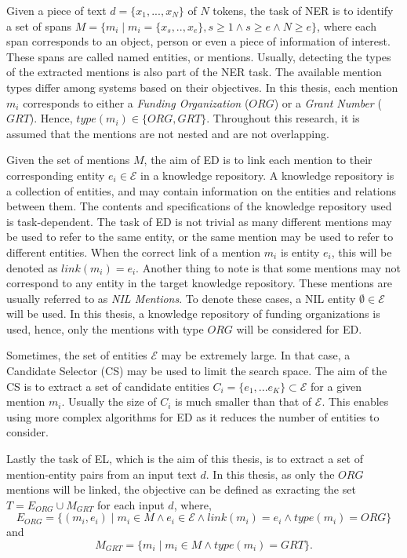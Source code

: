 \documentclass{report}
\theoremstyle{definition}
\theoremstyle{remark}
\begin{document}
Given a piece of text $d=\{x_1,...,x_N\}$ of $N$ tokens, the task of NER is to identify a set of spans $M = \{m_i \mid m_i = \{x_s,..,x_e\}, s \geq 1 \land s\geq e \land N \geq e\}$, where each span corresponds to an object, person or even a piece of information of interest. These spans are called named entities, or mentions. Usually, detecting the types of the extracted mentions is also part of the NER task. The available mention types differ among systems based on their objectives. In this thesis, each mention $m_i$ corresponds to either a \textit{Funding Organization} ($ORG$)  or a \textit{Grant Number} ($GRT$). Hence, $type(m_i) \in \{ORG,GRT\}$. Throughout this research, it is assumed that the mentions are not nested and are not overlapping.

Given the set of mentions $M$, the aim of ED is to link each mention to their corresponding entity $e_i \in \mathcal{E} $ in a knowledge repository. A knowledge repository is a collection of entities, and may contain information on the entities and relations between them. The contents and specifications of the knowledge repository used is task-dependent. The task of ED is not trivial as many different mentions may be used to refer to the same entity, or the same mention may be used to refer to different entities. When the correct link of a mention $m_i$ is entity $e_i$, this will be denoted as $link(m_i) = e_i $.  Another thing to note is that some mentions may not correspond to any entity in the target knowledge repository. These mentions are usually referred to as \textit{NIL Mentions}. To denote these cases, a NIL entity $\emptyset \in \mathcal{E}$ will be used. In this thesis, a knowledge repository of funding organizations is used, hence, only the mentions with type $ORG$ will be considered for ED.

Sometimes, the set of entities $\mathcal{E}$ may be extremely large. In that case, a Candidate Selector (CS) may be used to limit the search space. The aim of the CS is to extract a set of candidate entities $C_i = \{e_1,...e_K\} \subset \mathcal{E} $ for a given mention $m_i$. Usually the size of $C_i$ is much smaller than that of $\mathcal{E}$. This enables using more complex algorithms for ED as it reduces the number of entities to consider.

Lastly the task of EL, which is the aim of this thesis, is to extract a set of mention-entity pairs from an input text $d$. In this thesis, as only the $ORG$ mentions will be linked, the objective can be defined as exracting the set $T = E_{ORG} \cup M_{GRT}$ for each input $d$, where,
\begin{equation}
E_{ORG}=\{(m_i,e_i) \mid m_i \in M \land e_i \in \mathcal{E} \land link(m_i)=e_i \land type(m_i) = ORG\}
\end{equation}
and 
\begin{equation}
M_{GRT} = \{m_i \mid m_i \in M \land type(m_i) = GRT\}.
\end{equation}
\newpage
\end{document}
